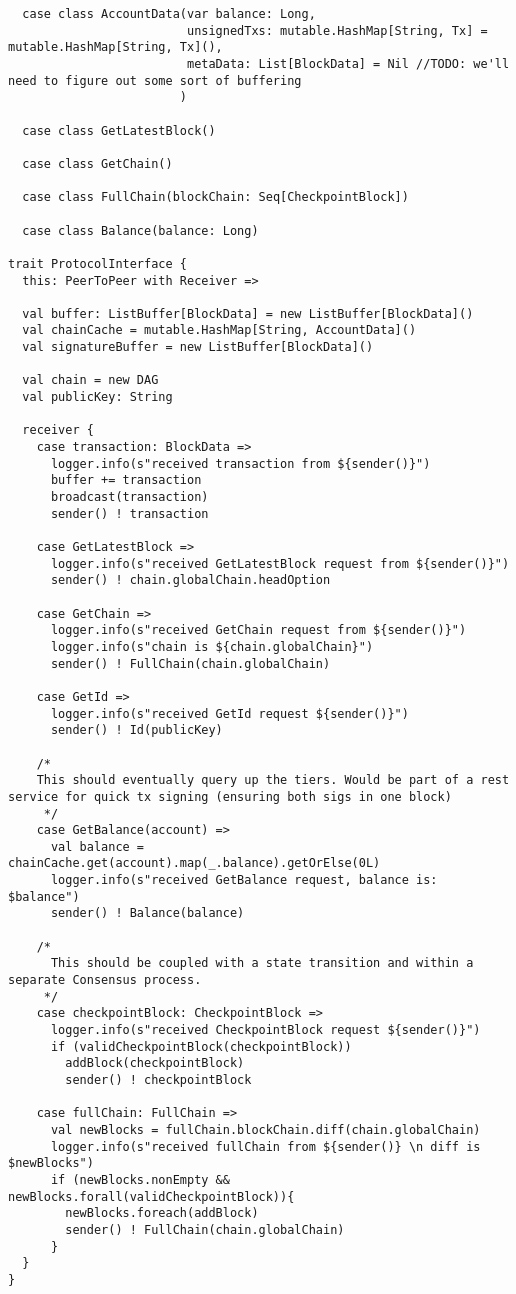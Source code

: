 \documentclass{article}
\begin{document}
\begin{lstlisting}
  case class AccountData(var balance: Long,
                         unsignedTxs: mutable.HashMap[String, Tx] = mutable.HashMap[String, Tx](),
                         metaData: List[BlockData] = Nil //TODO: we'll need to figure out some sort of buffering
                        )

  case class GetLatestBlock()

  case class GetChain()

  case class FullChain(blockChain: Seq[CheckpointBlock])

  case class Balance(balance: Long)

trait ProtocolInterface {
  this: PeerToPeer with Receiver =>

  val buffer: ListBuffer[BlockData] = new ListBuffer[BlockData]()
  val chainCache = mutable.HashMap[String, AccountData]()
  val signatureBuffer = new ListBuffer[BlockData]()

  val chain = new DAG
  val publicKey: String

  receiver {
    case transaction: BlockData =>
      logger.info(s"received transaction from ${sender()}")
      buffer += transaction
      broadcast(transaction)
      sender() ! transaction

    case GetLatestBlock =>
      logger.info(s"received GetLatestBlock request from ${sender()}")
      sender() ! chain.globalChain.headOption

    case GetChain =>
      logger.info(s"received GetChain request from ${sender()}")
      logger.info(s"chain is ${chain.globalChain}")
      sender() ! FullChain(chain.globalChain)

    case GetId =>
      logger.info(s"received GetId request ${sender()}")
      sender() ! Id(publicKey)

    /*
    This should eventually query up the tiers. Would be part of a rest service for quick tx signing (ensuring both sigs in one block)
     */
    case GetBalance(account) =>
      val balance = chainCache.get(account).map(_.balance).getOrElse(0L)
      logger.info(s"received GetBalance request, balance is: $balance")
      sender() ! Balance(balance)

    /*
      This should be coupled with a state transition and within a separate Consensus process.
     */
    case checkpointBlock: CheckpointBlock =>
      logger.info(s"received CheckpointBlock request ${sender()}")
      if (validCheckpointBlock(checkpointBlock))
        addBlock(checkpointBlock)
        sender() ! checkpointBlock

    case fullChain: FullChain =>
      val newBlocks = fullChain.blockChain.diff(chain.globalChain)
      logger.info(s"received fullChain from ${sender()} \n diff is $newBlocks")
      if (newBlocks.nonEmpty && newBlocks.forall(validCheckpointBlock)){
        newBlocks.foreach(addBlock)
        sender() ! FullChain(chain.globalChain)
      }
  }
}

\end{lstlisting}
\end{document}

